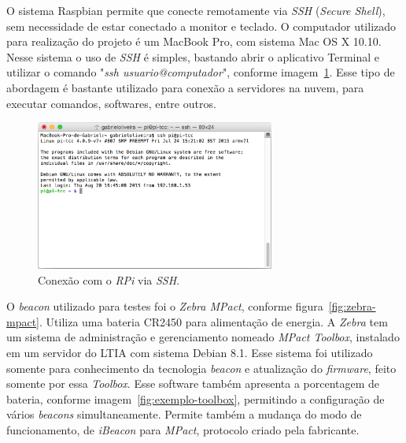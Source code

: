 \documentclass[
		12pt,				%
		openright,			%
		oneside,			%
		a4paper,			%
		chapter=TITLE,		%
		english,			%
		brazil				%
	]{abntex2}
\begin{document}
O sistema Raspbian permite que conecte remotamente via \textit{SSH} (\textit{Secure Shell}), sem necessidade de estar conectado a monitor e teclado. O computador utilizado para realização do projeto é um MacBook Pro, com sistema Mac OS X 10.10. Nesse sistema o uso de \textit{SSH} é simples, bastando abrir o aplicativo Terminal e utilizar o comando "\textit{ssh usuario@computador}", conforme imagem~\ref{fig:ex-terminal}. Esse tipo de abordagem é bastante utilizado para conexão a servidores na nuvem, para executar comandos, softwares, entre outros.

\begin{figure}[htb]
	\caption{\label{fig:ex-terminal}Conexão com o \textit{RPi} via \textit{SSH}.}
	\begin{center}
		\includegraphics[width=0.7\textwidth]{img/terminal-pi.png}
	\end{center}
\end{figure}

O \textit{beacon} utilizado para testes foi o \textit{Zebra MPact}, conforme figura~\ref{fig:zebra-mpact}. Utiliza uma bateria CR2450 para alimentação de energia. A \textit{Zebra} tem um sistema de administração e gerenciamento nomeado \textit{MPact Toolbox}, instalado em um servidor do LTIA com sistema Debian 8.1. Esse sistema foi utilizado somente para conhecimento da tecnologia \textit{beacon} e atualização do \textit{firmware}, feito somente por essa \textit{Toolbox}. Esse software também apresenta a porcentagem de bateria, conforme imagem~\ref{fig:exemplo-toolbox}, permitindo a configuração de vários \textit{beacons} simultaneamente. Permite também a mudança do modo de funcionamento, de \textit{iBeacon} para \textit{MPact}, protocolo criado pela fabricante.
\end{document}
